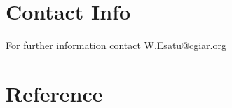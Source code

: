 \documentclass[a4paper,12pt]{article}
\begin{document}
\newpage


\newpage


\newpage
%







\newpage


\newpage




\newpage
\section{Contact Info}\label{sec:contact_info}

For further information contact W.Esatu@cgiar.org

\newpage
\section{Reference}
\printbibliography[title={References}]
\end{document}
